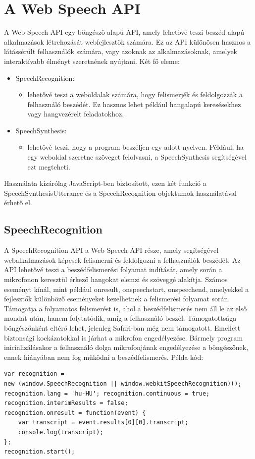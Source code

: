 \documentclass[12pt]{report}
\begin{document}
\section{A Web Speech API}
A Web Speech API \cite{webspeechapi} egy böngésző alapú API, amely lehetővé teszi beszéd alapú alkalmazások létrehozását webfejlesztők számára. Ez az API különösen hasznos a látássérült felhasználók számára, vagy azoknak az alkalmazásoknak, amelyek interaktívabb élményt szeretnének nyújtani. Két fő eleme:
\begin{itemize}
    \item SpeechRecognition:
    \begin{itemize}
	   \item lehetővé teszi a weboldalak számára, hogy felismerjék és feldolgozzák a felhasználó beszédét. Ez hasznos lehet például hangalapú keresésekhez vagy hangvezérelt feladatokhoz.
    \end{itemize}
    \item SpeechSynthesis:
    \begin{itemize}
	   \item lehetővé teszi, hogy a program beszéljen egy adott nyelven. Például, ha egy weboldal szeretne szöveget felolvasni, a SpeechSynthesis segítségével ezt megteheti.
    \end{itemize}
\end{itemize}
\newline
Használata kizárólag JavaScript-ben biztosított, ezen két funkció a SpeechSynthesisUtterance és a SpeechRecognition objektumok használatával érhető el.\cite{usingwebspeechapi}

\subsection{SpeechRecognition}
A SpeechRecognition \cite{speechrecognition} API a Web Speech API része, amely segítségével webalkalmazások képesek felismerni és feldolgozni a felhasználók beszédét. Az API lehetővé teszi a beszédfelismerési folyamat indítását, amely során a mikrofonon keresztül érkező hangokat elemzi és szöveggé alakítja. Számos eseményt kínál, mint például onresult, onspeechstart, onspeechend, amelyekkel a fejlesztők különböző eseményeket kezelhetnek a felismerési folyamat során. Támogatja a folyamatos felismerést is, ahol a beszédfelismerés nem áll le az első mondat után, hanem folytatódik, amíg a felhasználó beszél.
\newline
Támogatottsága böngészőnként eltérő lehet, jelenleg Safari-ban még nem támogatott. Emellett biztonsági kockázatokkal is járhat a mikrofon engedélyezése. Bármely program inicializálásakor a felhasználó dolga mikrofonjának engedélyezése a böngészőnek, ennek hiányában nem fog működni a beszédfelismerés.
\pagebreak
Példa kód:
\begin{verbatim}
var recognition =
new (window.SpeechRecognition || window.webkitSpeechRecognition)();
recognition.lang = 'hu-HU'; recognition.continuous = true;
recognition.interimResults = false;
recognition.onresult = function(event) {
    var transcript = event.results[0][0].transcript;
    console.log(transcript);
};
recognition.start();
\end{verbatim}
\end{document}
